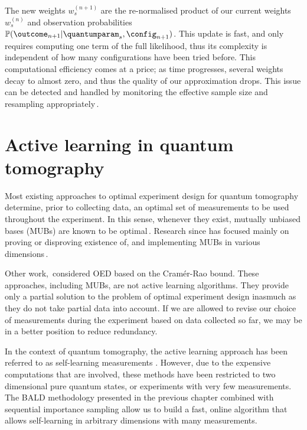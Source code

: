 The new weights $w^{(n+1)}_s$ are the re-normalised product of our current weights $w^{(n)}_s$ and observation probabilities $\mathbb{P}(\outcome_{n+1}\vert\quantumparam_s,\config_{n+1})$. This update is fast, and only requires computing one term of the full likelihood, thus its complexity is independent of how many configurations have been tried before. This computational efficiency comes at a price; as time progresses, several weights decay to almost zero, and thus the quality of our approximation drops. This issue can be detected and handled by monitoring the effective sample size and resampling appropriately\,\citep{SMCBook}.


\section{Active learning in quantum tomography}

Most existing approaches to optimal experiment design for quantum tomography determine, prior to collecting data, an optimal set of measurements to be used throughout the experiment. In this sense, whenever they exist, mutually unbiased bases (MUBs) are known to be optimal\,\citep{MUBFirst,MUBExperiment}. Research since has focused mainly on proving or disproving existence of, and implementing MUBs in various dimensions\,\citep{DimensionSix,MUBQutrit,MUBExperiment}.

Other work,\,\citep{OEDFirst,OEDAverage} considered OED based on the Cram\'{e}r-Rao bound. These approaches, including MUBs, are not active learning algorithms. They provide only a partial solution to the problem of optimal experiment design inasmuch as they do not take partial data into account. If we are allowed to revise our choice of measurements during the experiment based on data collected so far, we may be in a better position to reduce redundancy.

In the context of quantum tomography, the active learning approach has been referred to as self-learning measurements \citep{SelfLearning, SelfLearningExperimental}. However, due to the expensive computations that are involved, these methods have been restricted to two dimensional pure quantum states, or experiments with very few measurements. The BALD methodology presented in the previous chapter combined with sequential importance sampling allow us to build a fast, online algorithm that allows self-learning in arbitrary dimensions with many measurements. 

